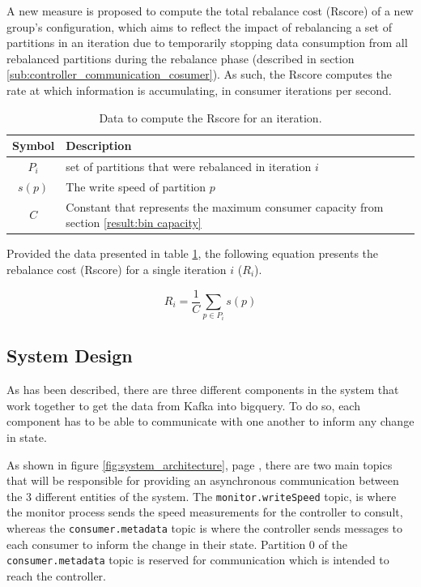 A new measure is proposed to compute the total rebalance cost (Rscore) of a new
group's configuration, which aims to reflect the impact of rebalancing a set of
partitions in an iteration due to temporarily stopping data consumption from
all rebalanced partitions during the rebalance phase (described
in section \ref{sub:controller_communication_cosumer}). As such, the Rscore
computes the rate at which information is accumulating, in consumer iterations
per second.

\begin{table}[H] 
\centering 
\caption{Data to compute the Rscore for an iteration.} 
\label{tab:rscore_data}
    \begin{tabular}{ |c|l| } 
        \hline 
        \textbf{Symbol} & \textbf{Description} \\ 
        \hline 
        $P_i$ & set of partitions that were rebalanced in iteration $i$ \\ 
        $s(p)$ & The write speed of partition $p$ \\ 
        $C$ &  Constant that represents the maximum consumer capacity from
            section \ref{result:bin capacity}\\ 
        \hline 
    \end{tabular} 
\end{table}

Provided the data presented in table \ref{tab:rscore_data}, the following
equation presents the rebalance cost (Rscore) for a single iteration $i$ ($R_i$).

\begin{equation} 
    R_i = \frac{1}{C}\sum_{p \in P_i} s(p) 
\end{equation}


\subsection{System Design}

As has been described, there are three different components in the system that
work together to get the data from Kafka into bigquery. To do so, each component
has to be able to communicate with one another to inform any change in state.

As shown in figure \ref{fig:system_architecture}, page
\pageref{fig:system_architecture}, there are two main topics that will be
responsible for providing an asynchronous communication between the 3 different
entities of the system. The \lstinline{monitor.writeSpeed} topic, is where the
monitor process sends the speed measurements for the controller to consult,
whereas the \lstinline{consumer.metadata} topic is where the controller sends
messages to each consumer to inform the change in their state. Partition 0 of
the \lstinline{consumer.metadata} topic is reserved for communication which is
intended to reach the controller.

